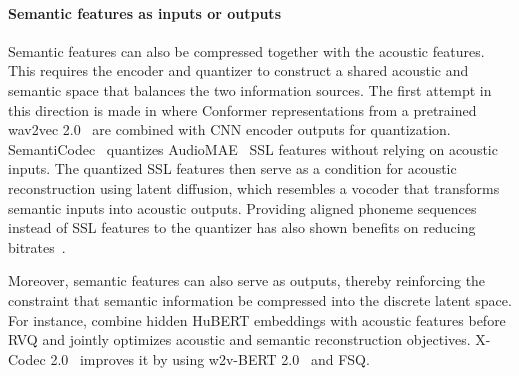 \paragraph{Semantic features as inputs or outputs} 
Semantic features can also be compressed together with the acoustic features. 
This requires the encoder and quantizer to construct a shared acoustic and semantic space that balances the two information sources. 
The first attempt in this direction is made in \cite{siahkoohi22_interspeech} where Conformer representations from a pretrained wav2vec 2.0~\cite{baevski2020wav2vec} are combined with CNN encoder outputs for quantization.
SemantiCodec~\cite{liu2024semanticodec} quantizes AudioMAE~\cite{huang2022masked} SSL features
without relying on acoustic inputs. 
The quantized SSL features then serve as a condition for acoustic reconstruction using latent diffusion, which resembles a vocoder that transforms semantic inputs into acoustic outputs.
Providing aligned phoneme sequences instead of SSL features to the quantizer has also shown benefits on reducing bitrates~\cite{du2024funcodec}.

Moreover, semantic features can also serve as outputs, thereby reinforcing the constraint that semantic information be compressed into the discrete latent space.
For instance, \cite{guo2024socodec,ye2024codec} combine hidden HuBERT embeddings with acoustic features before RVQ and jointly optimizes acoustic and semantic reconstruction objectives.
X-Codec 2.0~\cite{ye2025llasa} improves it by using w2v-BERT 2.0~\cite{barrault2023seamless} and FSQ.

